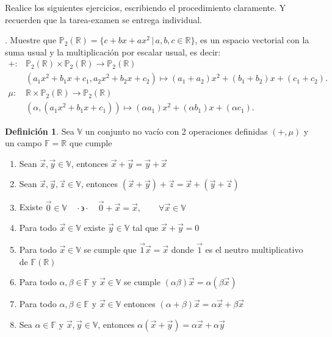 \documentclass[letterpaper]{article}
\newcommand{\V}{\mathds{V}}
\newcommand{\F}{\mathds{F}}
\newcommand{\tq}{ \quad \cdot  \backepsilon \cdot \quad }
\newcommand{\R}{\mathds{R}}
\renewcommand{\*}{\cdot}
\theoremstyle{definition}
\newtheorem{definition}{Definición}
\begin{document}
\vspace{0.5cm}
\noindent Realice los siguientes ejercicios, escribiendo el procedimiento claramente. Y recuerden que la tarea-examen se entrega individual. 

. Muestre que $\mathbb{P}_{2}(\mathbb{R}) = \{ c  + bx + ax^2  \,  \vert \, a,b,c \in \mathbb{R} \}$, es un espacio vectorial con la suma usual y la multiplicación por escalar usual, es decir:
\begin{align*}
     + \colon & \mathbb{P}_{2}(\mathbb{R}) \times \mathbb{P}_{2}(\mathbb{R}) \longrightarrow \mathbb{P}_{2}(\mathbb{R}) \\
    & (a_1 x^2 + b_1x + c_1 , a_2 x^2 + b_2x + c_2) \mapsto  (a_1 + a_2)x^2 + (b_1 + b_2)x + (c_1 + c_2). \\
    \mu \colon & \mathbb{R} \times \mathbb{P}_{2}(\mathbb{R}) \longrightarrow \mathbb{P}_{2}(\mathbb{R}) \\
    & (\alpha, (a_1 x^2 + b_1x + c_1)) \mapsto  (\alpha a_1)x^2 + (\alpha b_1)x + (\alpha c_1).
 \end{align*}
\begin{definition}
	Sea $ \V $ un conjunto no vacío con 2 operaciones definidas $ (+,\mu) $ y un campo $ \F = \R $ que cumple
	\begin{enumerate}
		\item Sean $ \vec{x}, \vec{y} \in \V $, entonces $ \vec{x} + \vec{y} = \vec{y} + \vec{x} $
		\item Sean $ \vec{x}, \vec{y}, \vec{z} \in \V $, entonces
		$ (\vec{x} + \vec{y}) + \vec{z} = \vec{x} + (\vec{y} + \vec{z}) $
		\item Existe $ \vec{0} \in \V \tq \vec{0} + \vec{x} = \vec{x}, \qquad \forall \vec{x} \in \V$
		\item Para todo $ \vec{x} \in \V $ existe $ \vec{y} \in \V $ tal que $ \vec{x} + \vec{y} = 0 $
		\item Para todo $ \vec{x} \in \V $ se cumple que $ \vec{1} \vec{x} = \vec{x} $ donde $ \vec{1} $ es el neutro multiplicativo de $ \F(\R) $
		\item Para todo $ \alpha, \beta \in \F $ y $ \vec{x} \in \V $ se cumple $ (\alpha\beta)\vec{x} = \alpha(\beta \vec{x}) $
		\item Para todo $ \alpha, \beta  \in \F$ y $ \vec{x} \in \V $ entonces $ (\alpha + \beta)\vec{x} = \alpha\vec{x} + \beta\vec{x} $
		\item Sea $ \alpha \in \F $ y $ \vec{x}, \vec{y} \in \V $, entonces $ \alpha(\vec{x} + \vec{y}) = \alpha\vec{x} + \alpha\vec{y} $
	\end{enumerate}
\end{definition}
\end{document}
